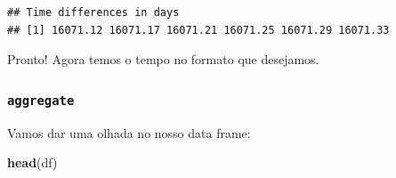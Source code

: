 \documentclass[]{book}
\newenvironment{Shaded}{\begin{snugshade}}{\end{snugshade}}
\newcommand{\KeywordTok}[1]{\textcolor[rgb]{0.13,0.29,0.53}{\textbf{#1}}}
\newcommand{\StringTok}[1]{\textcolor[rgb]{0.31,0.60,0.02}{#1}}
\newcommand{\OperatorTok}[1]{\textcolor[rgb]{0.81,0.36,0.00}{\textbf{#1}}}
\newcommand{\NormalTok}[1]{#1}
\theoremstyle{definition}
\theoremstyle{definition}
\theoremstyle{definition}
\theoremstyle{remark}
\begin{document}
\begin{verbatim}
## Time differences in days
## [1] 16071.12 16071.17 16071.21 16071.25 16071.29 16071.33
\end{verbatim}

\begin{Shaded}
\end{Shaded}

Pronto! Agora temos o tempo no formato que desejamos.

\subsubsection{\texorpdfstring{\texttt{aggregate}}{aggregate}}\label{aggregate}

Vamos dar uma olhada no nosso data frame:

\begin{Shaded}
\begin{Highlighting}[]
\KeywordTok{head}\NormalTok{(df)}
\end{Highlighting}
\end{Shaded}
\end{document}
